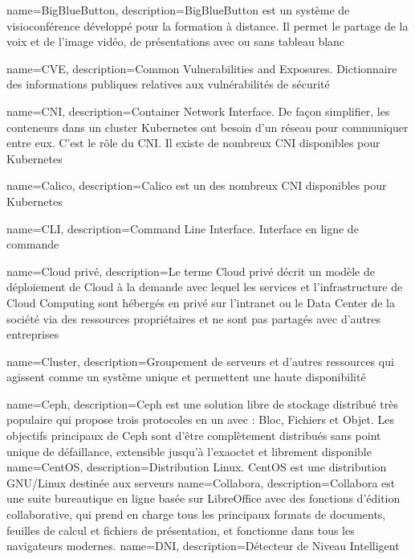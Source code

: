 {
    name=BigBlueButton,
    description={BigBlueButton est un système de visioconférence développé pour la formation à distance. Il permet le partage de la voix et de l'image vidéo, de présentations avec ou sans tableau blanc}
}

{
    name=CVE,
    description={Common Vulnerabilities and Exposures. Dictionnaire des informations publiques relatives aux vulnérabilités de sécurité}
}

{
    name=CNI,
    description={Container Network Interface. De façon simplifier, les conteneurs dans un cluster Kubernetes ont besoin d'un réseau pour communiquer entre eux. C'est le rôle du CNI. Il existe de nombreux CNI disponibles pour Kubernetes}
}

{
    name=Calico,
    description={Calico est un des nombreux CNI disponibles pour Kubernetes}
}

{
    name=CLI,
    description={Command Line Interface. Interface en ligne de commande}
}

{
    name=Cloud privé,
    description={Le terme Cloud privé décrit un modèle de déploiement de Cloud à la demande avec lequel les services et l'infrastructure de Cloud Computing sont hébergés en privé sur l'intranet ou le Data Center de la société via des ressources propriétaires et ne sont pas partagés avec d'autres entreprises}
}

{
    name=Cluster,
    description={Groupement de serveurs et d’autres ressources qui agissent comme un système unique et permettent une haute disponibilité}
}

{
    name=Ceph,
    description={Ceph est une solution libre de stockage distribué très populaire qui propose trois protocoles en un avec : Bloc, Fichiers et Objet. Les objectifs principaux de Ceph sont d'être complètement distribués sans point unique de défaillance, extensible jusqu'à l'exaoctet et librement disponible}
}
{
    name=CentOS,
    description={Distribution Linux. CentOS est une distribution GNU/Linux destinée aux serveurs}
}
{
    name=Collabora,
    description={Collabora est une suite bureautique en ligne basée sur LibreOffice avec des fonctions d'édition collaborative, qui prend en charge tous les principaux formats de documents, feuilles de calcul et fichiers de présentation, et fonctionne dans tous les navigateurs modernes.}
}
{
    name=DNI,
    description={Détecteur de Niveau Intelligent}
}

